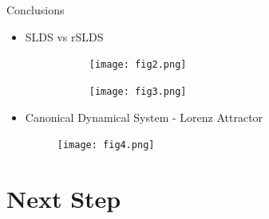 \documentclass{beamer}
\begin{document}
\begin{frame}{Conclusions}
        \begin{itemize}
            \item SLDS vs rSLDS
            \begin{figure}[h!]
                \centering
                \begin{subfigure}[b]{0.3\textwidth}
                    \texttt{[image: fig2.png]}
                \end{subfigure}
                \begin{subfigure}[b]{0.3\textwidth}
                    \texttt{[image: fig3.png]}
                \end{subfigure}
            \end{figure}

            \item Canonical Dynamical System - Lorenz Attractor
            \begin{figure}[h!]
                \centering
                \texttt{[image: fig4.png]}
            \end{figure}
        \end{itemize}

    \end{frame}

\section{Next Step}
\end{document}
